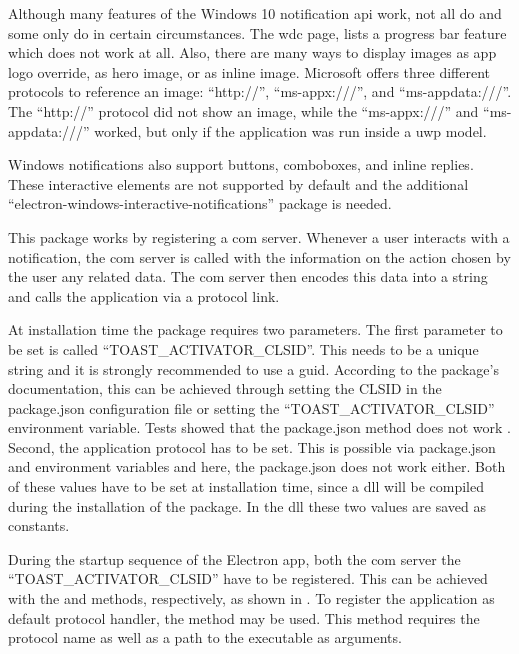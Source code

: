 Although many features of the Windows 10 notification \gls{api} work, not all do and some only do in certain circumstances. The \gls{wdc} page, \zB lists a progress bar feature which does not work at all. Also, there are many ways to display images \zB as app logo override, as hero image, or as inline image. Microsoft offers three different protocols to reference an image: \enquote{http://}, \enquote{ms-appx:///}, and \enquote{ms-appdata:///}. The \enquote{http://} protocol did not show an image, while the \enquote{ms-appx:///} and \enquote{ms-appdata:///} worked, but only if the application was run inside a \gls{uwp} model. \cite{toastContent}


Windows notifications also support buttons, comboboxes, and inline replies. These interactive elements are not supported by default and the additional \enquote{electron-windows-interactive-notifications} package is needed.

This package works by registering a \gls{com} server. Whenever a user interacts with a notification, the \gls{com} server is called with the information on the action chosen by the user any related data. The \gls{com} server then encodes this data into a string and calls the application via a protocol link.

At installation time the package requires two parameters. The first parameter to be set is called \enquote{TOAST\_ACTIVATOR\_CLSID}. This needs to be a unique string and it is strongly recommended to use a \gls{guid}. According to the package's documentation, this can be achieved through setting the CLSID in the package.json configuration file or setting the \enquote{TOAST\_ACTIVATOR\_CLSID} environment variable. Tests showed that the package.json method does not work \cite{clsidPackageJson}. Second, the application protocol has to be set. This is possible via package.json and environment variables and here, the package.json does not work either. Both of these values have to be set at installation time, since a \gls{dll} will be compiled during the installation of the package. In the \gls{dll} these two values are saved as constants.

During the startup sequence of the Electron app, both the \gls{com} server the \enquote{TOAST\_ACTIVATOR\_CLSID} have to be registered. This can be achieved with the  and  methods, respectively, as shown in . To register the application as default protocol handler, the  method may be used. This method requires the protocol name as well as a path to the executable as arguments.

